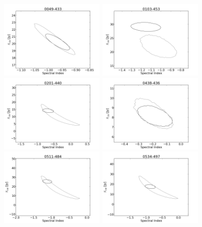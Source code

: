 \documentclass[preprint]{aastex}
\begin{document}
\begin{figure}[htbp]
\begin{center}
\includegraphics[width=2in]{plots/0049-433_SI_MCMC.png} %
\includegraphics[width=2in]{plots/0103-453_SI_MCMC.png} %
\includegraphics[width=2in]{plots/0201-440_SI_MCMC.png} %
\includegraphics[width=2in]{plots/0438-436_SI_MCMC.png} %
\includegraphics[width=2in]{plots/0511-484_SI_MCMC.png} %
\includegraphics[width=2in]{plots/0534-497_SI_MCMC.png} %

\end{center}
\end{figure}
\end{document}
